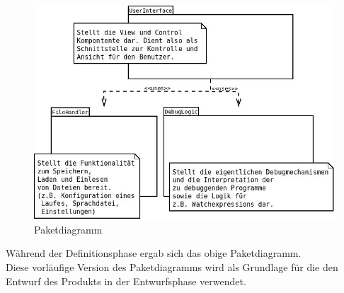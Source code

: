 \documentclass[parskip=full]{scrartcl}
\begin{document}
\begin{figure}[!ht]
	\centering
	\includegraphics[width=1.0\textwidth]{pakete}
	\caption{Paketdiagramm}
	\label{fig:Bild3} 

\end{figure}
\vspace{0.7cm}
	Während der Definitionsphase ergab sich das obige Paketdiagramm.\\ 
	Diese vorläufige Version des Paketdiagramms wird als Grundlage für die den Entwurf des
	Produkts in der Entwurfsphase verwendet.
	
\newpage
\end{document}
